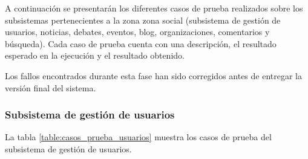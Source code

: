 A continuación se presentarán los diferentes casos de prueba realizados sobre los subsistemas pertenecientes a la zona zona social (subsistema de gestión de usuarios, noticias, debates, eventos, blog, organizaciones, comentarios y búsqueda).  Cada caso de prueba cuenta con una descripción, el resultado esperado en la ejecución y el resultado obtenido.

Los fallos encontrados durante esta fase han sido corregidos antes de entregar la versión final del sistema.

\subsubsection{Subsistema de gestión de usuarios}
La tabla \ref{table:casos_prueba_usuarios} muestra los casos de prueba del subsistema de gestión de usuarios.


